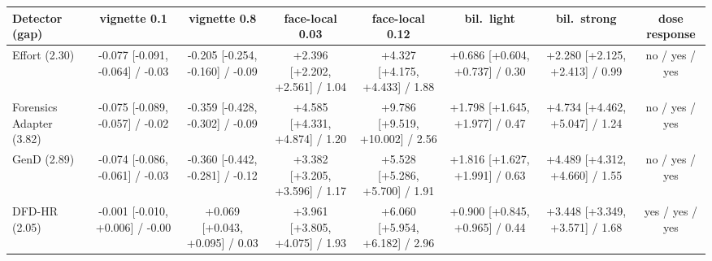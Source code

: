 \begin{tabular}{@{}l cccccc c@{}}
\toprule
Detector (gap) & vignette 0.1 & vignette 0.8 & face-local 0.03 & face-local 0.12 & bil.\ light & bil.\ strong & dose response \\
\midrule
Effort (2.30) & -0.077 [-0.091, -0.064] / -0.03 & -0.205 [-0.254, -0.160] / -0.09 & +2.396 [+2.202, +2.561] / 1.04 & +4.327 [+4.175, +4.433] / 1.88 & +0.686 [+0.604, +0.737] / 0.30 & +2.280 [+2.125, +2.413] / 0.99 & no / yes / yes \\
Forensics Adapter (3.82) & -0.075 [-0.089, -0.057] / -0.02 & -0.359 [-0.428, -0.302] / -0.09 & +4.585 [+4.331, +4.874] / 1.20 & +9.786 [+9.519, +10.002] / 2.56 & +1.798 [+1.645, +1.977] / 0.47 & +4.734 [+4.462, +5.047] / 1.24 & no / yes / yes \\
GenD (2.89) & -0.074 [-0.086, -0.061] / -0.03 & -0.360 [-0.442, -0.281] / -0.12 & +3.382 [+3.205, +3.596] / 1.17 & +5.528 [+5.286, +5.700] / 1.91 & +1.816 [+1.627, +1.991] / 0.63 & +4.489 [+4.312, +4.660] / 1.55 & no / yes / yes \\
DFD-HR (2.05) & -0.001 [-0.010, +0.006] / -0.00 & +0.069 [+0.043, +0.095] / 0.03 & +3.961 [+3.805, +4.075] / 1.93 & +6.060 [+5.954, +6.182] / 2.96 & +0.900 [+0.845, +0.965] / 0.44 & +3.448 [+3.349, +3.571] / 1.68 & yes / yes / yes \\
\bottomrule
\end{tabular}
